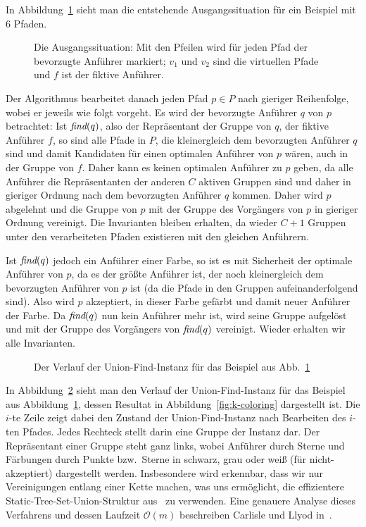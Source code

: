 In Abbildung~\ref{fig:union-find-setup} sieht man die entstehende Ausgangssituation für ein Beispiel mit 6 Pfaden.

\begin{figure}[htbp]
	\centering
	\def\svgwidth{250bp}
	
	\caption{Die Ausgangssituation: Mit den Pfeilen wird für jeden Pfad der bevorzugte Anführer markiert; $v_1$ und $v_2$ sind die virtuellen Pfade und $f$ ist der fiktive Anführer.}
	\label{fig:union-find-setup}
\end{figure}

Der Algorithmus bearbeitet danach jeden Pfad $p \in P$ nach gieriger Reihenfolge, wobei er jeweils wie folgt vorgeht.
Es wird der bevorzugte Anführer $q$ von $p$ betrachtet:
Ist $\text{\em find}(q)$, also der Repräsentant der Gruppe von $q$, der fiktive Anführer $f$, so sind alle Pfade in $P$, die kleinergleich dem bevorzugten Anführer $q$
sind und damit Kandidaten für einen optimalen Anführer von $p$ wären, auch in der Gruppe von $f$. Daher kann es keinen optimalen Anführer zu $p$ geben,
da alle Anführer die Repräsentanten der anderen $C$ aktiven Gruppen sind und daher in gieriger Ordnung nach dem bevorzugten Anführer $q$ kommen.
Daher wird $p$ abgelehnt und die Gruppe von $p$ mit der Gruppe des Vorgängers von $p$ in gieriger Ordnung vereinigt.
Die Invarianten bleiben erhalten, da wieder $C+1$ Gruppen unter den verarbeiteten Pfaden existieren mit den gleichen
Anführern.

Ist $\text{\em find}(q)$ jedoch ein Anführer einer Farbe, so ist es mit Sicherheit der optimale Anführer von $p$, da es der größte
Anführer ist, der noch kleinergleich dem bevorzugten Anführer von $p$ ist (da die Pfade in den Gruppen
aufeinanderfolgend sind).
Also wird $p$ akzeptiert, in dieser Farbe gefärbt und damit neuer Anführer der Farbe.
Da $\text{\em find}(q)$ nun kein Anführer mehr ist, wird seine Gruppe aufgelöst und mit der Gruppe des Vorgängers von $\text{\em find}(q)$
vereinigt.
Wieder erhalten wir alle Invarianten.

\begin{figure}[htbp]
	\centering
	\def\svgwidth{280bp}
	
	\caption{Der Verlauf der Union-Find-Instanz für das Beispiel aus Abb.~\ref{fig:union-find-setup}}
	\label{fig:union-find-structure}
\end{figure}

In Abbildung~\ref{fig:union-find-structure} sieht man den Verlauf der Union-Find-Instanz für das Beispiel aus Abbildung~\ref{fig:union-find-setup}, dessen Resultat in Abbildung~\ref{fig:k-coloring} dargestellt ist.
Die $i$-te Zeile zeigt dabei den Zustand der Union-Find-Instanz nach Bearbeiten des $i$-ten Pfades.
Jedes Rechteck stellt darin eine Gruppe der Instanz dar.
Der Repräsentant einer Gruppe steht ganz links, wobei Anführer durch Sterne und Färbungen durch Punkte bzw.\ Sterne in schwarz, grau oder weiß (für nicht-akzeptiert) dargestellt werden.
Insbesondere wird erkennbar, dass wir nur Vereinigungen entlang einer Kette machen, was uns ermöglicht, die effizientere Static-Tree-Set-Union-Struktur
aus~\cite{static-tree-set-union} zu verwenden.
Eine genauere Analyse dieses Verfahrens und dessen Laufzeit $\mathcal O(m)$ beschreiben Carlisle und Llyod in~\cite{carlisle}.

